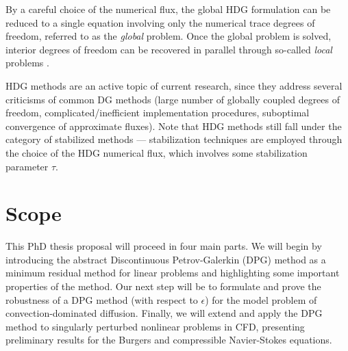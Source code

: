 By a careful choice of the numerical flux, the global HDG formulation can be reduced to a single equation involving only the numerical trace degrees of freedom, referred to as the \emph{global} problem. Once the global problem is solved, interior degrees of freedom can be recovered in parallel through so-called \emph{local} problems \cite{HDGprojection}. 

HDG methods are an active topic of current research, since they address several criticisms of common DG methods (large number of globally coupled degrees of freedom, complicated/inefficient implementation procedures, suboptimal convergence of approximate fluxes). Note that HDG methods still fall under the category of stabilized methods --- stabilization techniques are employed through the choice of the HDG numerical flux, which involves some stabilization parameter $\tau$. 

\section{Scope}

This PhD thesis proposal will proceed in four main parts.  We will begin by introducing the abstract Discontinuous Petrov-Galerkin (DPG) method as a minimum residual method for linear problems and highlighting some important properties of the method.  Our next step will be to formulate and prove the robustness of a DPG method (with respect to $\epsilon$) for the model problem of convection-dominated diffusion.  Finally, we will extend and apply the DPG method to singularly perturbed nonlinear problems in CFD, presenting preliminary results for the Burgers and compressible Navier-Stokes equations.  

%
%
